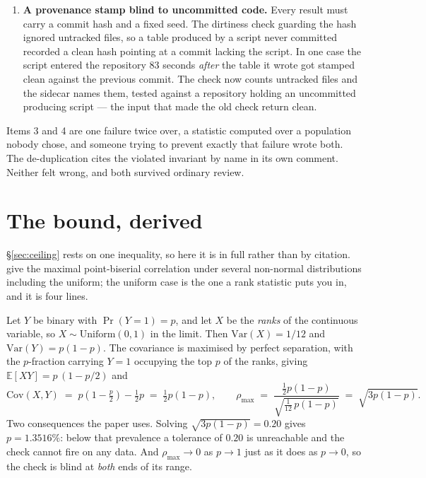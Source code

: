 \begin{enumerate}
\item \textbf{A provenance stamp blind to uncommitted code.} Every result must
carry a commit hash and a fixed seed. The dirtiness check guarding the hash
ignored untracked files, so a table produced by a script never committed
recorded a clean hash pointing at a commit lacking the script. In one case the
script entered the repository 83 seconds \emph{after} the table it wrote got
stamped clean against the previous commit. The check now counts untracked files
and the sidecar names them, tested against a repository holding an uncommitted
producing script --- the input that made the old check return clean.
\end{enumerate}

Items 3 and 4 are one failure twice over, a statistic computed over a
population nobody chose, and someone trying to prevent exactly that failure
wrote both. The de-duplication cites the violated invariant by name in its own
comment. Neither felt wrong, and both survived ordinary review.

\section{The bound, derived}
\label{app:bound}

\S\ref{sec:ceiling} rests on one inequality, so here it is in full rather than
by citation. \citet{chengliu2016} give the maximal point-biserial correlation
under several non-normal distributions including the uniform; the uniform case
is the one a rank statistic puts you in, and it is four lines.

Let $Y$ be binary with $\Pr(Y = 1) = p$, and let $X$ be the \emph{ranks} of the
continuous variable, so $X \sim \mathrm{Uniform}(0,1)$ in the limit. Then
$\mathrm{Var}(X) = 1/12$ and $\mathrm{Var}(Y) = p(1-p)$. The covariance is
maximised by perfect separation, with the $p$-fraction carrying $Y = 1$
occupying the top $p$ of the ranks, giving $\mathbb{E}[XY] = p\,(1 - p/2)$ and
\[
\mathrm{Cov}(X, Y) \;=\; p\left(1 - \tfrac{p}{2}\right) - \tfrac{1}{2}p
\;=\; \tfrac{1}{2}p(1-p),
\qquad
\rho_{\max} \;=\; \frac{\tfrac{1}{2}p(1-p)}
{\sqrt{\tfrac{1}{12}\,p(1-p)}} \;=\; \sqrt{3p(1-p)}.
\]
Two consequences the paper uses. Solving $\sqrt{3p(1-p)} = 0.20$ gives $p =
1.3516\%$: below that prevalence a tolerance of $0.20$ is unreachable and the
check cannot fire on any data. And $\rho_{\max} \to 0$ as $p \to 1$ just as it
does as $p \to 0$, so the check is blind at \emph{both} ends of its range.

